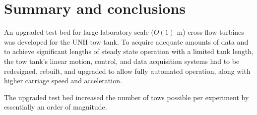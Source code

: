 \section{Summary and conclusions}

An upgraded test bed for large laboratory scale ($O(1)$ m) cross-flow turbines
was developed for the UNH tow tank. To acquire adequate amounts of data and to
achieve significant lengths of steady state operation with a limited tank
length, the tow tank's linear motion, control, and data acquisition systems had
to be redesigned, rebuilt, and upgraded to allow fully automated operation,
along with higher carriage speed and acceleration.

The upgraded test bed increased the number of tows possible per experiment by
essentially an order of magnitude.

